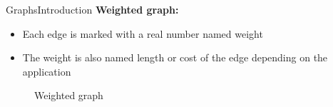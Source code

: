 
\begin{frame}{Graphs}{Introduction}
  \textbf{Weighted graph:}
  \begin{itemize}
    \item<2->
      Each edge is marked with a real number named {\color{Mittel-Blau}weight}
    \item<3->
      The {\color{Mittel-Blau}weight} is also named {\color{Mittel-Blau}length}
      or {\color{Mittel-Blau}cost} of the edge depending on the application
  \end{itemize}
  \begin{figure}
    \begin{adjustbox}{width=0.75\linewidth}
      
    \end{adjustbox}
    \caption{Weighted graph}
    \label{fig:graphs:introduction_weighted}
  \end{figure}
\end{frame}


